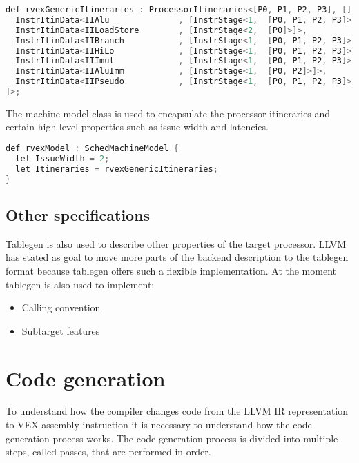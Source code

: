 \begin{lstlisting}[language=java] 
def rvexGenericItineraries : ProcessorItineraries<[P0, P1, P2, P3], [], [
  InstrItinData<IIAlu              , [InstrStage<1,  [P0, P1, P2, P3]>]>,
  InstrItinData<IILoadStore        , [InstrStage<2,  [P0]>]>,
  InstrItinData<IIBranch           , [InstrStage<1,  [P0, P1, P2, P3]>]>,
  InstrItinData<IIHiLo             , [InstrStage<1,  [P0, P1, P2, P3]>]>,
  InstrItinData<IIImul             , [InstrStage<1,  [P0, P1, P2, P3]>]>,
  InstrItinData<IIAluImm           , [InstrStage<1,  [P0, P2]>]>,
  InstrItinData<IIPseudo           , [InstrStage<1,  [P0, P1, P2, P3]>]>
]>;
\end{lstlisting}

The machine model class is used to encapsulate the processor itineraries and certain high level properties such as issue width and latencies.

\begin{lstlisting}[language=java] 
def rvexModel : SchedMachineModel {
  let IssueWidth = 2;
  let Itineraries = rvexGenericItineraries;
}
\end{lstlisting}

\subsection{Other specifications}
Tablegen is also used to describe other properties of the target processor. LLVM has stated as goal to move more parts of the backend description to the tablegen format because tablegen offers such a flexible implementation. At the moment tablegen is also used to implement:

\begin{itemize}
	\item Calling convention
	\item Subtarget features
\end{itemize}

\section{Code generation}
To understand how the compiler changes code from the LLVM IR representation to VEX assembly instruction it is necessary to understand how the code generation process works. The code generation process is divided into multiple steps, called passes, that are performed in order. 

